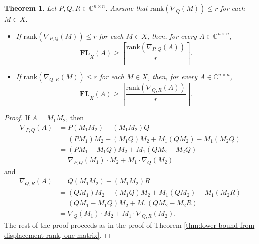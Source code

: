 \documentclass[reqno]{amsart}
\newtheorem{theorem}{Theorem}[section]
\theoremstyle{definition}
\newcommand{\rank}{\mathrm{rank}}
\numberwithin{equation}{section}
\begin{document}
\begin{theorem}\label{thm:lower bound from displacement rank, two matrices}
     Let $P,Q,R \in \mathbb{C}^{n \times n}$. Assume that $\rank(\nabla_{Q}(M)) \leq r$ for each $M \in X$.
    \begin{itemize}
        \item [(\romannumeral1)] If $\rank(\nabla_{P,Q}(M)) \leq r$ for each $M \in X$, then, for every $A \in \mathbb{C}^{n \times n}$,
    \begin{equation*}
        \underline{\mathbf{FL}}_X(A) \geq \left\lceil \frac{\rank(\nabla_{P,Q}(A))}{r} \right\rceil.
    \end{equation*}
        \item [(\romannumeral2)] If $\rank(\nabla_{Q,R}(M)) \leq r$ for each $M \in X$, then, for every $A \in \mathbb{C}^{n \times n}$,
    \begin{equation*}
        \underline{\mathbf{FL}}_X(A) \geq \left\lceil \frac{\rank(\nabla_{Q,R}(A))}{r} \right\rceil.
    \end{equation*}
    \end{itemize}
\end{theorem}
\begin{proof}
    If $A=M_1M_2$, then 
    \begin{equation*}
        \begin{aligned}
            \nabla_{P,Q}(A)&=P(M_1M_2)-(M_1M_2)Q\\
            &=(PM_1)M_2-(M_1Q)M_2+M_1(QM_2)-M_1(M_2Q)\\
            &=(PM_1-M_1Q)M_2+M_1(QM_2-M_2Q)\\
            &=\nabla_{P,Q}(M_1) \cdot M_2+M_1 \cdot \nabla_{Q}(M_2)
        \end{aligned}
    \end{equation*}
    and
    \begin{equation*}
        \begin{aligned}
            \nabla_{Q,R}(A)&=Q(M_1M_2)-(M_1M_2)R\\
            &=(QM_1)M_2-(M_1Q)M_2+M_1(QM_2)-M_1(M_2R)\\
            &=(QM_1-M_1Q)M_2+M_1(QM_2-M_2R)\\
            &=\nabla_{Q}(M_1) \cdot M_2+M_1 \cdot \nabla_{Q,R}(M_2).
        \end{aligned}
    \end{equation*}
    The rest of the proof proceeds as in the proof of Theorem \ref{thm:lower bound from displacement rank, one matrix}.
\end{proof}
\end{document}
